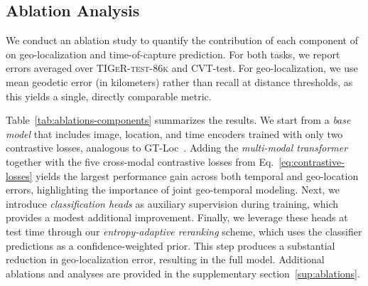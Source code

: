 \begin{table}[h]
    \centering
    \caption{Cumulative ablation study on the components of \tiger.}
    \label{tab:ablations-components}
\end{table}

\subsection{Ablation Analysis}

We conduct an ablation study to quantify the contribution of each component of \tiger on geo-localization and time-of-capture prediction. For both tasks, we report errors averaged over \textsc{TIGeR-test-86k} and CVT-test. For geo-localization, we use mean geodetic error (in kilometers) rather than recall at distance thresholds, as this yields a single, directly comparable metric.

Table~\ref{tab:ablations-components} summarizes the results. We start from a \emph{base model} that includes image, location, and time encoders trained with only two contrastive losses, analogous to GT-Loc~\cite{Shatwell_2025_ICCV}. Adding the \emph{multi-modal transformer} together with the five cross-modal contrastive losses from Eq.~\ref{eq:contrastive-losses} yields the largest performance gain across both temporal and geo-location errors, highlighting the importance of joint geo-temporal modeling. Next, we introduce \emph{classification heads} as auxiliary supervision during training, which provides a modest additional improvement. Finally, we leverage these heads at test time through our \emph{entropy-adaptive reranking} scheme, which uses the classifier predictions as a confidence-weighted prior. This step produces a substantial reduction in geo-localization error, resulting in the full \tiger model. Additional ablations and analyses are provided in the supplementary section~\ref{sup:ablations}.

